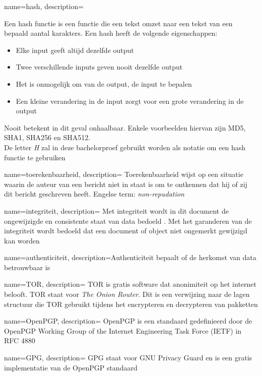 {
	name={hash},
	description={
		Een hash functie is een functie die een tekst omzet naar een 
		tekst van een bepaald aantal karakters. Een hash heeft de volgende 
		eigenschappen:
		\begin{itemize}
			\item Elke input geeft altijd dezelfde output
			\item Twee verschillende inputs geven nooit dezelfde output
			\item Het is onmogelijk om van de output, de input te bepalen
			\item Een kleine verandering in de input zorgt voor een grote 
			verandering in de output
		\end{itemize}
		Nooit betekent in dit geval onhaalbaar.
		Enkele voorbeelden hiervan zijn MD5, SHA1, SHA256 en SHA512. \\
		De letter \textit{H} zal in deze bachelorproef gebruikt worden als 
		notatie om een hash functie te gebruiken}
}

{
	name={toerekenbaarheid},
	description={
		Toerekenbaarheid wijst op een situatie waarin de auteur van een bericht 
		niet in staat is om te ontkennen dat hij of zij dit bericht 
		geschreven heeft. Engelse term: \textit{non-repudation}}
}

{
	name={integriteit},
	description={
		Met integriteit wordt in dit document de ongewijzigde en
		consistente staat van data bedoeld \autocite{Boritz2005}. Met het
		garanderen van de integriteit wordt bedoeld dat een document
		of object niet ongemerkt gewijzigd kan worden}
}

{
	name={authenticiteit},
	description={Authenticiteit bepaalt of de herkomst van data betrouwbaar is}
}

{
	name={TOR},
	description={
		TOR is gratis software dat anonimiteit op het internet belooft. TOR staat voor \textit{The Onion Router}. Dit is een verwijzing naar de    lagen structuur die TOR gebruikt tijdens het encrypteren en decrypteren van pakketten}
}

{
	name={OpenPGP},
	description={
		OpenPGP is een standaard gedefinieerd door de OpenPGP Working Group of the Internet Engineering Task Force (IETF) in RFC 4880}
}


{
	name={GPG},
	description={
		GPG staat voor GNU Privacy Guard en is een gratis implementatie van de OpenPGP standaard}
}





